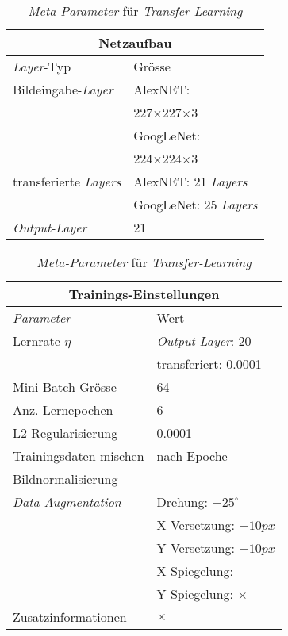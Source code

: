 \begin{table}[!htb]
	\def\arraystretch{1.4}
	\centering
	\begin{subtable}[t]{.5\linewidth}
		\begin{tabular}[t]{l | l }
			\multicolumn{2}{c}{\textbf{Netzaufbau}}\\
			\hline
			\textit{Layer}-Typ & Grösse\\
			\hline
			\hline
			Bildeingabe-\textit{Layer} & AlexNET:\\
									   & 227$\times$227$\times$3\\
									   & GoogLeNet:\\
									   & 224$\times$224$\times$3\\
			\hline
			transferierte \textit{Layers}& AlexNET: 21 \textit{Layers}\\
										& GoogLeNet: 25 \textit{Layers}\\
			\hline
			\textit{Output-Layer}   & 21\\
		\end{tabular}
	\end{subtable}%
	\begin{subtable}[t]{.5\linewidth}
		\begin{tabular}[t]{l | l }
			\multicolumn{2}{c}{\textbf{Trainings-Einstellungen}}\\
			\hline
			\textit{Parameter} & Wert\\
			\hline
			\hline
			Lernrate $\eta$ & \textit{Output-Layer}: 20 \\
			& transferiert: 0.0001\\
			Mini-Batch-Grösse & 64\\
			Anz. Lernepochen & 6\\
			L2 Regularisierung & 0.0001\\
			Trainingsdaten mischen& nach Epoche\\
			Bildnormalisierung & \checkmark\\
			\textit{Data-Augmentation}& Drehung: $\pm25^{\circ}$ \\
									& X-Versetzung: $\pm10px$ \\
									& Y-Versetzung: $\pm10px$ \\
									& X-Spiegelung: \checkmark \\
									& Y-Spiegelung: $\times$ \\
									Zusatzinformationen &  $\times$ \\
		\end{tabular}
	\end{subtable} 
	\caption[\textit{Meta-Parameter} \textit{Transfer-Learning}]{\textit{Meta-Parameter} für \textit{Transfer-Learning}}
	\label{table:transfer_training}
\end{table}

